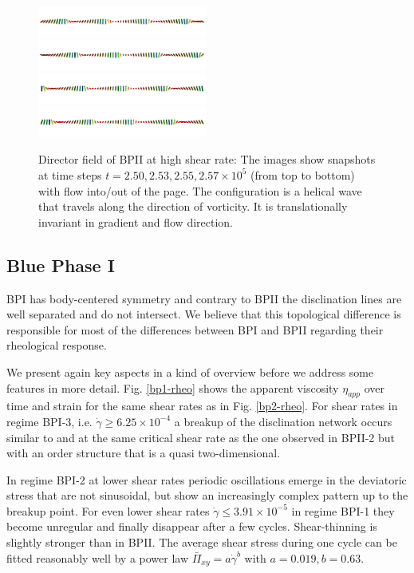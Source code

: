 \documentclass[aps,pre,reprint,superscriptaddress, twocolumn]{revtex4}
\newcommand{\e}[1]{\times10^{#1}}
\newcommand{\gd}{\dot{\gamma}}
\begin{document}
\begin{figure}[htpb]
\includegraphics[width=0.495\textwidth]{dir+y-250k_run949.png}
\includegraphics[width=0.495\textwidth]{dir+y-253k_run949.png}
\includegraphics[width=0.495\textwidth]{dir+y-255k_run949.png}
\includegraphics[width=0.495\textwidth]{dir+y-257k_run949.png}
\caption{Director field of BPII at high shear rate: The images show snapshots at time steps 
$t=2.50, 2.53,2.55, 2.57\e{5}$ (from top to bottom) with flow into/out of the page. 
The configuration is a helical wave that travels along the direction of vorticity.
It is translationally invariant in gradient and flow direction.}
\label{bp2-high}
\end{figure}

\subsection{Blue Phase I}

BPI has body-centered symmetry and contrary to BPII the disclination lines
 are well separated and do not intersect.
We believe that this topological difference is responsible for most of
the differences between BPI and BPII regarding their rheological response. 

We present again key aspects in a kind of overview before we 
address some features in more detail. Fig. \ref{bp1-rheo} shows the 
apparent viscosity $\eta_{app}$ over time and strain for the same shear rates
as in Fig. \ref{bp2-rheo}.
For shear rates in regime BPI-3, i.e. $\gd\ge6.25\e{-4}$ a breakup of 
the disclination network occurs similar to and at the same critical shear rate as 
the one observed in BPII-2 but with an order structure that is a quasi 
two-dimensional.

In regime BPI-2 at lower shear rates periodic oscillations emerge in the 
deviatoric stress that are not sinusoidal, but show an increasingly complex
pattern up to the breakup point.
For even lower shear rates $\gd\le3.91\e{-5}$ in regime BPI-1 
they become  unregular and finally disappear after a few
cycles. Shear-thinning is slightly stronger than in BPII. 
The average shear stress during one cycle can be fitted reasonably 
well by a power law $\bar{\Pi}_{xy}=a \gd^b$ with $a=0.019, b=0.63$.
\end{document}

